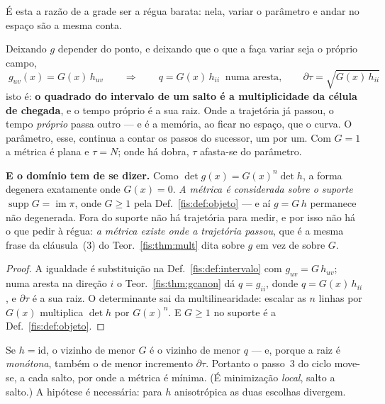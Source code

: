 \documentclass[livro.tex]{subfiles}
\begin{document}
\medskip\noindent É esta a razão de a grade ser a régua barata: nela, variar o
parâmetro e andar no espaço são a mesma conta.

\begin{teorema}\label{fis:thm:campo}
Deixando $g$ depender do ponto, e deixando que o que a faça variar seja o
próprio campo,
\[
\boxed{\;g_{uv}(x)=G(x)\,h_{uv}
\qquad\Longrightarrow\qquad
q=G(x)\,h_{ii}\ \text{ numa aresta},\qquad
\partial\tau=\sqrt{G(x)\,h_{ii}}\;}
\]
isto é: \textbf{o quadrado do intervalo de um salto é a multiplicidade da célula
de chegada}, e o tempo próprio é a sua raiz. Onde a trajetória já passou, o
tempo \emph{próprio} passa outro --- e é a memória, ao ficar no espaço, que o
curva. O parâmetro, esse, continua a contar os passos do sucessor, um por um. Com
$G=1$ a métrica é plana e $\tau=N$; onde há dobra, $\tau$ afasta-se do
parâmetro.

\medskip\noindent\textbf{E o domínio tem de se dizer.} Como
$\det g(x)=G(x)^{n}\det h$, a forma degenera exatamente onde $G(x)=0$. \emph{A
métrica é considerada sobre o suporte} $\operatorname{supp}G=\operatorname{im}\pi$,
onde $G\ge1$ pela Def.~\ref{fis:def:objeto} --- e aí $g=G\,h$ permanece não
degenerada. Fora do suporte não há trajetória para medir, e por isso não há o que
pedir à régua: \emph{a métrica existe onde a trajetória passou}, que é a mesma
frase da cláusula~(3) do Teor.~\ref{fis:thm:mult} dita sobre $g$ em vez de sobre
$G$.
\end{teorema}

\begin{proof}
A igualdade é substituição na Def.~\ref{fis:def:intervalo} com $g_{uv}=G\,h_{uv}$;
numa aresta na direção $i$ o Teor.~\ref{fis:thm:gcanon} dá $q=g_{ii}$, donde
$q=G(x)\,h_{ii}$, e $\partial\tau$ é a sua raiz. O determinante sai da
multilinearidade: escalar as $n$ linhas por $G(x)$ multiplica $\det h$ por
$G(x)^{n}$. E $G\ge1$ no suporte é a Def.~\ref{fis:def:objeto}.
\end{proof}

\begin{teorema}\label{fis:thm:geodesica}
Se $h=\mathrm{id}$, o vizinho de menor $G$ é o vizinho de menor $q$ --- e, porque
a raiz é \emph{monótona}, também o de menor incremento $\partial\tau$. Portanto o
passo~3 do ciclo move-se, a cada salto, por onde a métrica é mínima. (É
minimização \emph{local}, salto a salto.) A hipótese é necessária: para $h$
anisotrópica as duas escolhas divergem.
\end{teorema}
\end{document}
